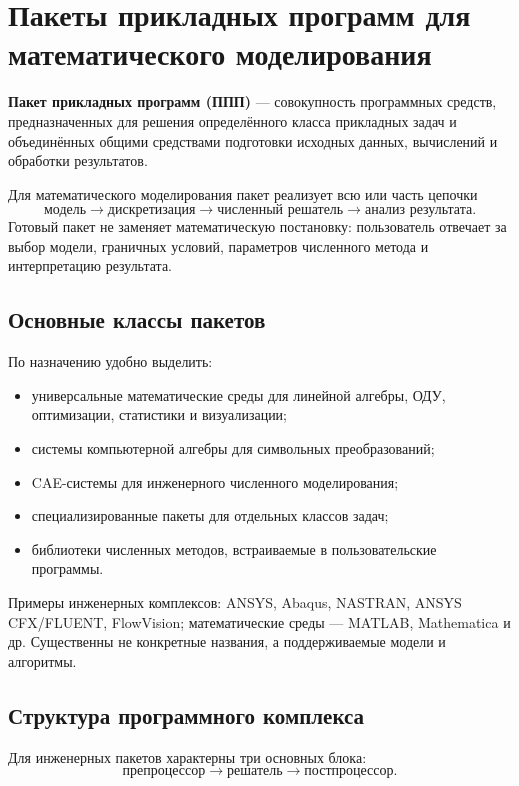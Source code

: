 \section{Пакеты прикладных программ для математического моделирования}

\textbf{Пакет прикладных программ (ППП)} --- совокупность программных средств, предназначенных для решения определённого класса прикладных задач и объединённых общими средствами подготовки исходных данных, вычислений и обработки результатов.

Для математического моделирования пакет реализует всю или часть цепочки
\[
\text{модель}
\rightarrow
\text{дискретизация}
\rightarrow
\text{численный решатель}
\rightarrow
\text{анализ результата}.
\]
Готовый пакет не заменяет математическую постановку: пользователь отвечает за выбор модели, граничных условий, параметров численного метода и интерпретацию результата.

\subsection{Основные классы пакетов}

По назначению удобно выделить:
\begin{itemize}
\item универсальные математические среды для линейной алгебры, ОДУ, оптимизации, статистики и визуализации;
\item системы компьютерной алгебры для символьных преобразований;
\item CAE-системы для инженерного численного моделирования;
\item специализированные пакеты для отдельных классов задач;
\item библиотеки численных методов, встраиваемые в пользовательские программы.
\end{itemize}

Примеры инженерных комплексов: ANSYS, Abaqus, NASTRAN, ANSYS CFX/FLUENT, FlowVision; математические среды --- MATLAB, Mathematica и др. Существенны не конкретные названия, а поддерживаемые модели и алгоритмы.

\subsection{Структура программного комплекса}

Для инженерных пакетов характерны три основных блока:
\[
\boxed{\text{препроцессор}\rightarrow\text{решатель}\rightarrow\text{постпроцессор}}.
\]

